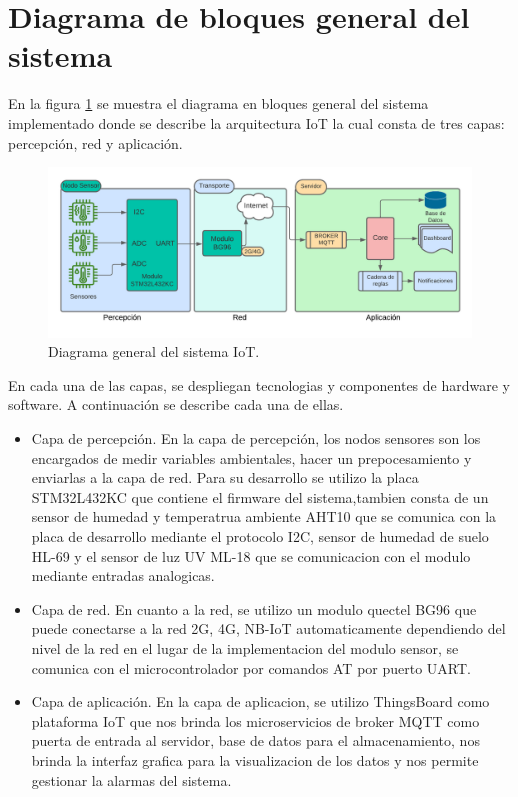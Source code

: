 \section{Diagrama de bloques general del sistema}

En la figura \ref{fig:Diagrama general del sistema IoT} se muestra el diagrama en bloques general del sistema implementado donde se describe la arquitectura IoT la cual consta de tres capas: percepción, red y aplicación.

\begin{figure}[htbp]
	\includegraphics[width=1\textwidth]{./Figures/DiagramaDelSistema.png}
	\caption{Diagrama general del sistema IoT.}
	\label{fig:Diagrama general del sistema IoT}
\end{figure}

En cada una de las capas, se despliegan tecnologias y componentes de hardware y software. A continuación se describe cada una de ellas.

\begin{itemize}
	\item Capa de percepción. En la capa de percepción, los nodos sensores son los encargados de medir variables ambientales, hacer un prepocesamiento y enviarlas a la capa de red. Para su desarrollo se utilizo la placa STM32L432KC que contiene el firmware del sistema,tambien consta de un sensor de humedad y temperatrua ambiente AHT10 que se comunica con la placa de desarrollo mediante el protocolo I2C, sensor de humedad de suelo HL-69 y el sensor de luz UV ML-18 que se comunicacion con el modulo mediante entradas analogicas.
  \item Capa de red. En cuanto a la red, se utilizo un modulo quectel BG96 que puede conectarse a la red 2G, 4G, NB-IoT automaticamente dependiendo del nivel de la red en el lugar de la implementacion del modulo sensor, se comunica con el microcontrolador por comandos AT por puerto UART.
  \item Capa de aplicación. En la capa de aplicacion, se utilizo ThingsBoard como plataforma IoT que nos brinda los microservicios de broker MQTT como puerta de entrada al servidor, base de datos para el almacenamiento, nos brinda la interfaz grafica para la visualizacion de los datos y nos permite gestionar la alarmas del sistema.


\end{itemize}

